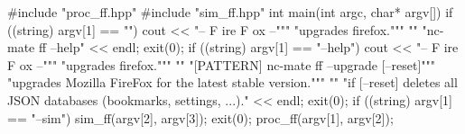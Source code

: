#include "proc_ff.hpp"
#include "sim_ff.hpp"
int main(int argc, char* argv[]) {
	if ((string) argv[1] == "") {
		cout <<
		"-- F ire F ox --""\n"
		"upgrades firefox.""\n"
		"\n"
		"nc-mate ff --help"
		<< endl;
		exit(0);
	}
	if ((string) argv[1] == "--help") {
		cout <<
		"-- F ire F ox --""\n"
		"upgrades firefox.""\n"
		"\n"
		"[PATTERN] nc-mate ff --upgrade [--reset]""\n"
		"upgrades Mozilla FireFox for the latest stable version.""\n"
		"\n"
		"if [--reset] deletes all JSON databases (bookmarks, settings, ...)."
		<< endl;
		exit(0);
	}
	if ((string) argv[1] == "--sim") {sim_ff(argv[2], argv[3]); exit(0);}
	proc_ff(argv[1], argv[2]);
}
